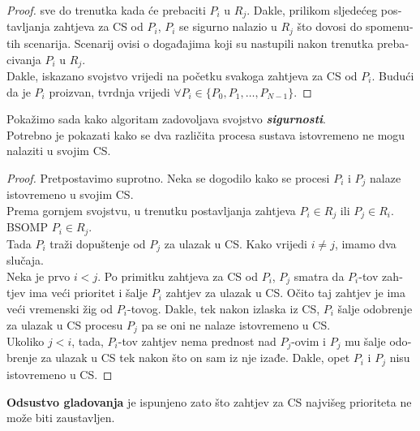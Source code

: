 \documentclass[12pt]{rectors}
\begin{document}
\begin{otherlanguage}{croatian}
\begin{proof}
	sve do trenutka kada će prebaciti $P_i$ u $R_j$.
	Dakle, prilikom sljedećeg postavljanja zahtjeva za CS od $P_i$, $P_i$ se sigurno nalazio u $R_j$ što dovosi do spomenutih scenarija. Scenarij ovisi o događajima koji su nastupili nakon trenutka prebacivanja $P_i$ u $R_j$. 
	\vspace{0.5cm}
	\\Dakle, iskazano svojstvo vrijedi na početku svakoga zahtjeva za CS od $P_i$. Budući da je $P_i$ proizvan, tvrdnja vrijedi $\forall P_i \in \{P_0,P_1,\hdots,P_{N-1}\}$.
\end{proof}
\vspace{0.5cm}
Pokažimo sada kako algoritam zadovoljava svojstvo \textbf{\textit{sigurnosti}}.\\
Potrebno je pokazati kako se dva različita procesa sustava istovremeno ne mogu nalaziti u svojim CS.\\
\begin{proof}
Pretpostavimo suprotno. Neka se dogodilo kako se procesi $P_i$ i $P_j$ nalaze istovremeno u svojim CS.\\  
Prema gornjem svojstvu, u trenutku postavljanja zahtjeva $P_i \in R_j$ ili $P_j \in R_i$. \\
BSOMP $P_i \in R_j$.\\
Tada $P_i$ traži dopuštenje od $P_j$ za ulazak u CS. Kako vrijedi $i \not = j$, imamo dva slučaja.\\
Neka je prvo $i < j$.
Po primitku zahtjeva za CS od $P_i$, $P_j$ smatra da $P_i$-tov zahtjev ima veći prioritet 
i šalje $P_i$ zahtjev za ulazak u CS. Očito taj zahtjev je ima veći vremenski žig od $P_i$-tovog. Dakle, tek nakon izlaska iz CS, $P_i$ šalje odobrenje za ulazak u CS procesu $P_j$ pa se oni ne nalaze istovremeno u CS.\\
Ukoliko $j < i$, tada, $P_i$-tov zahtjev nema prednost nad $P_j$-ovim i $P_j$ mu šalje odobrenje za ulazak u CS tek nakon što on sam iz nje izađe. Dakle, opet $P_i$ i $P_j$ nisu istovremeno u CS.
\end{proof}%
%
\textbf{Odsustvo gladovanja} je ispunjeno zato što zahtjev za CS najvišeg prioriteta ne može biti
zaustavljen.\\


\end{otherlanguage}
\end{document}
